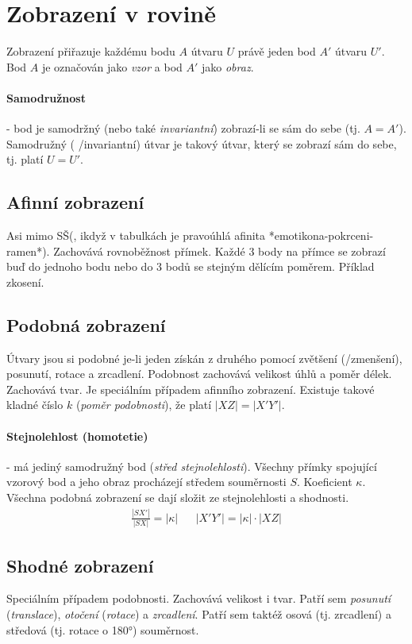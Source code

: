 \documentclass[12pt]{article}
\begin{document}
\section{Zobrazení v rovině}
Zobrazení přiřazuje každému bodu $A$ útvaru $U$ právě jeden bod $A'$ útvaru $U'$. Bod $A$ je označován jako \emph{vzor} a bod $A'$ jako \emph{obraz}.
\paragraph{Samodružnost} - bod je samodržný (nebo také \emph{invariantní}) zobrazí-li se sám do sebe (tj. $A =A'$). Samodružný ( /invariantní) útvar je takový útvar, který se zobrazí sám do sebe, tj. platí $U=U'$.
\subsection{Afinní zobrazení}
Asi mimo SŠ(, ikdyž v tabulkách je pravoúhlá afinita *emotikona-pokrceni-ramen*). Zachovává rovnoběžnost přímek. Každé 3 body na přímce se zobrazí buď do jednoho bodu nebo do 3 bodů se stejným dělícím poměrem. Příklad zkosení.
\subsection{Podobná zobrazení}
Útvary jsou si podobné je-li jeden získán z druhého pomocí zvětšení (/zmenšení), posunutí, rotace a zrcadlení. Podobnost zachovává velikost úhlů a poměr délek. Zachovává tvar. Je speciálním případem afinního zobrazení. Existuje takové kladné číslo $k$ (\emph{poměr podobnosti}), že platí $|XZ| = |X'Y'|$.
\paragraph{Stejnolehlost (homotetie)} - má jediný samodružný bod (\emph{střed stejnolehlosti}). Všechny přímky spojující vzorový bod a jeho obraz procházejí středem souměrnosti $S$. Koeficient $\kappa$. Všechna podobná zobrazení se dají složit ze stejnolehlosti a shodnosti.
\begin{align}
\frac{|SX'|}{|SX|} = |\kappa| && |X'Y'| = |\kappa|\cdot|XZ|
\end{align}
\subsection{Shodné zobrazení}
Speciálním případem podobnosti. Zachovává velikost i tvar. Patří sem \emph{posunutí} (\emph{translace}),  \emph{otočení} (\emph{rotace}) a \emph{zrcadlení}. Patří sem taktéž osová (tj. zrcadlení) a středová (tj. rotace o 180°) souměrnost.
\end{document}
